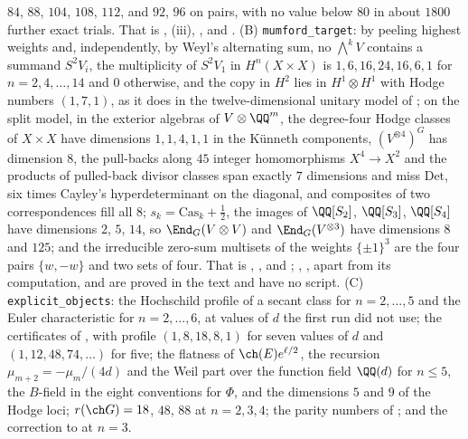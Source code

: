 \begin{enumerate}[label=\textup{(\Roman*)},leftmargin=*]
  $84$, $88$, $104$, $108$, $112$, and $92$, $96$ on pairs, with no value
  below $80$ in about $1800$ further exact trials. That is
  , (iii),
  ,  and
  . (B) \texttt{mumford\_\allowbreak target}: by
  peeling highest weights and, independently, by Weyl's alternating sum, no
  $\bigwedge^{k}V$ contains a summand $S^{2}V_{i}$, the multiplicity of
  $S^{2}V_{1}$ in $H^{n}(X\times X)$ is $1,6,16,24,16,6,1$ for
  $n=2,4,\dots,14$ and $0$ otherwise, and the copy in $H^{2}$ lies in
  $H^{1}\otimes H^{1}$ with Hodge numbers $(1,7,1)$, as it does in the
  twelve-dimensional unitary model of ; on the split
  model, in the exterior algebras of $V\otimes\QQ^{m}$, the degree-four Hodge
  classes of $X\times X$ have dimensions $1,1,4,1,1$ in the K\"unneth
  components, $(V^{\otimes4})^{G}$ has dimension $8$, the pull-backs along $45$
  integer homomorphisms $X^{4}\to X^{2}$ and the products of pulled-back
  divisor classes span exactly $7$ dimensions and miss $\mathrm{Det}$, six
  times Cayley's hyperdeterminant on the diagonal, and composites of two
  correspondences fill all $8$; $s_{k}=\mathrm{Cas}_{k}+\frac12$, the images of
  $\QQ[S_{2}]$, $\QQ[S_{3}]$, $\QQ[S_{4}]$ have dimensions $2$, $5$, $14$, so
  $\End_{G}(V\otimes V)$ and $\End_{G}(V^{\otimes3})$ have dimensions $8$ and
  $125$; and the irreducible zero-sum multisets of the weights $\{\pm1\}^{3}$
  are the four pairs $\{w,-w\}$ and two sets of four. That is
  , , 
  and ; ,
  ,  apart from its
  computation, and  are proved in the text and have
  no script. (C) \texttt{explicit\_\allowbreak objects}: the Hochschild
  profile of a secant class for $n=2,\dots,5$ and the Euler characteristic for
  $n=2,\dots,6$, at values of $d$ the first run did not use; the certificates
  of , with profile $(1,8,18,8,1)$ for seven values of
  $d$ and $(1,12,48,74,\dots)$ for five; the flatness of
  $\ch(E)e^{\ell/2}$, the recursion $\mu_{m+2}=-\mu_{m}/(4d)$ and the Weil
  part over the function field $\QQ(d)$ for $n\le5$, the $B$-field in the
  eight conventions for $\Phi$, and the dimensions $5$ and $9$ of the Hodge
  loci; $r(\ch G)=18$, $48$, $88$ at $n=2,3,4$; the parity numbers of
  ; and the correction to  at $n=3$.

\end{enumerate}
